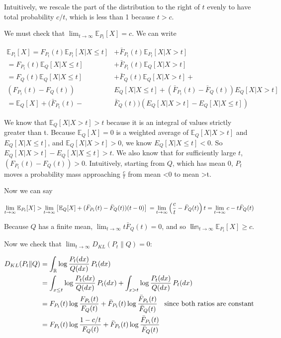 \documentclass{article}
\theoremstyle{plain}
\theoremstyle{definition}
\theoremstyle{remark}
\begin{document}
Intuitively, we rescale the part of the distribution to the right of
\(t\) evenly to have total probability \(c/t\), which is less than 1
because \(t > c\).

We must check that \(\lim_{t \to \infty} \mathbb E_{P_t}[X] = c\). We
can write

\begin{align*} \mathbb E_{P_t}[X] = F_{P_t}(t) \mathbb E_{P_t}[X | X \le t] &+ \bar F_{P_t}(t) \mathbb E_{P_t}[X | X > t]    \\ = F_{P_t}(t) \mathbb E_Q[X | X \le t] &+ \bar F_{P_t}(t) \mathbb E_Q[X | X > t]    \\ = F_Q(t) \mathbb E_Q[X | X \le t] &+ \bar F_Q(t) \mathbb E_Q[X | X > t] + \\ (F_{P_t}(t) - F_Q(t))&E_Q[X | X \le t] + (\bar F_{P_t}(t) - \bar F_Q(t)) E_Q[X | X > t]     \\ = \mathbb E_Q[X] + (\bar F_{P_t}(t) - &\bar F_Q(t))(E_Q[X | X > t] - E_Q[X | X \le t])
\end{align*}

We know that \(\mathbb E_Q[X | X > t] > t\) because it is an integral of
values strictly greater than t. Because \(\mathbb E_Q[X] = 0\) is a
weighted average of \(\mathbb E_Q[X|X>t]\) and \(E_Q[X | X \le t]\), and
\(\mathbb E_Q[X|X>t] > 0\), we know \(E_Q[X | X \le t] < 0\). So
\(E_Q[X | X > t] - E_Q[X | X \le t] > t.\) We also know that for
sufficiently large \(t\), \((F_{P_t}(t) - F_Q(t)) > 0\). Intuitively,
starting from \(Q\), which has mean 0, \(P_t\) moves a probability mass
approaching \(\frac c t\) from mean \textless0 to mean \textgreater t.

Now we can say

\[
\lim_{t \to \infty} \mathbb E_{P_t}[X] > \lim_{t \to \infty}\left[ \mathbb E_Q[X] + (\bar F_{P_t}(t) - \bar F_Q(t))(t-0) \right]
\\ = \lim_{t \to \infty}\left( \frac c t - \bar F_Q(t) \right) t = \lim_{t \to \infty}c - t \bar F_Q(t)
\]

Because \(Q\) has a finite mean,
\(\lim_{t \to \infty} t \bar F_Q(t) = 0\), and so
\(\mathbb \lim_{t \to \infty} \mathbb E_{P_t}[X] \ge c\).

Now we check that \(\lim_{t \to \infty} D_{KL}(P_t \| Q) = 0\):

\begin{align*}D_{KL}({P_t} \| Q) &= \int_{\mathbb R} \log \frac{{P_t}(dx)}{Q(dx)} \,{P_t}(dx)\\&= \int_{x \le t} \log \frac{{P_t}(dx)}{Q(dx)} \,{P_t}(dx) + \int_{x > t} \log \frac{{P_t}(dx)}{Q(dx)} \,{P_t}(dx)\\ &= F_{P_t}(t) \log \frac{F_{P_t}(t)}{F_Q(t)} + \bar F_{P_t}(t) \log \frac{\bar F_{P_t}(t)}{\bar F_Q(t)} \text{\quad since both ratios are constant}\\ &= F_{P_t}(t) \log \frac{1 - c/t}{F_Q(t)} + \bar F_{P_t}(t) \log \frac{\bar F_{P_t}(t)}{\bar F_Q(t)}\end{align*}
\end{document}
